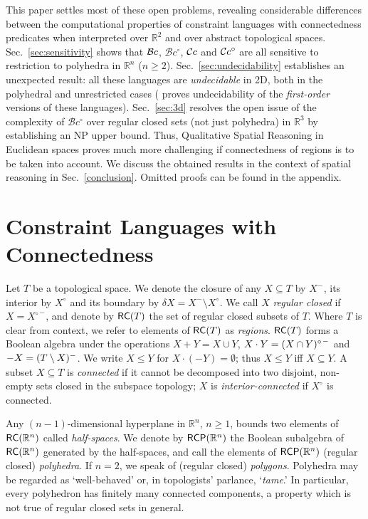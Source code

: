 \documentclass{article}
\newcommand{\cBci}{\ensuremath{\mathcal{B}c^\circ}}
\newcommand{\R}{\mathbb{R}}
\newcommand{\RC}{{\sf RC}}
\newcommand{\RCP}{{\sf RCP}}
\newcommand{\ti}[2][]{{#2}^{\circ_{#1}}}
\newcommand{\tc}[2][]{{#2}^{-_{#1}}}
\begin{document}
This paper settles most of these open problems, revealing considerable
differences between the computational properties of constraint
languages with connectedness predicates when interpreted over $\R^2$
and over abstract topological spaces.  Sec.~\ref{sec:sensitivity}
shows that $\mathcal{B}c$, $\cBci$, $\mathcal{C}c$ and $\mathcal{C}c^\circ$ are all sensitive to
restriction to polyhedra in $\R^n$ ($n \geq
2$). Sec.~\ref{sec:undecidability} establishes an unexpected result:
all these languages are \emph{undecidable} in 2D, both in the
polyhedral and unrestricted cases (\cite{Dornheim} proves
undecidability of the \emph{first-order} versions of these
languages). Sec.~\ref{sec:3d} resolves the open issue of the
complexity of $\cBci$ over regular closed sets (not just polyhedra) in
$\R^3$ by establishing an NP upper bound.  Thus, Qualitative Spatial
Reasoning in Euclidean spaces proves much more challenging if
connectedness of regions is to be taken into account.  We discuss the
obtained results in the context of spatial reasoning in
Sec.~\ref{conclusion}.  Omitted proofs can be found in the appendix. 






\section{Constraint Languages with Connectedness}\label{sec:preliminaries}

Let $T$ be a topological space. We denote the closure of any $X
\subseteq T$ by $\tc{X}$, its interior by $\ti{X}$ and its boundary by
$\delta X = \tc{X} \setminus \ti{X}$. We call $X$ {\em regular closed}
if $X = \tc{\ti{X}}$, and denote by $\RC(T)$ the set of regular closed
subsets of $T$. Where $T$ is clear from context, we refer to elements
of $\RC(T)$ as {\em regions}. $\RC(T)$ forms a Boolean algebra under
the operations $X + Y = X \cup Y$, $X \cdot Y =
\smash{\tc{\ti{\smash{(X \cap Y)}}}}$ and $-X = \tc{\smash{(T
    \setminus X)}}$. We write $X \leq Y$ for $X \cdot (-Y) = \emptyset$; thus
$X \leq Y$ iff $X \subseteq Y$.  A subset $X \subseteq T$ is
\emph{connected} if it cannot be decomposed into two disjoint,
non-empty sets closed in the subspace topology; $X$ is
\emph{interior-connected} if $\ti{X}$ is connected.

Any $(n-1)$-dimensional hyperplane in $\R^n$, $n \geq 1$, bounds two
elements of $\RC(\R^n)$ called \emph{half-spaces}. We denote by
$\RCP(\R^n)$ the Boolean subalgebra of $\RC(\R^n)$ generated by the
half-spaces, and call the elements of $\RCP(\R^n)$ (regular closed)
\emph{polyhedra}. If $n = 2$, we speak of (regular closed)
\emph{polygons}. Polyhedra may be regarded as `well-behaved' or, in
topologists' parlance, `\emph{tame}.'  In particular, every polyhedron
has finitely many connected components, a property which is not true
of regular closed sets in general.
\end{document}
